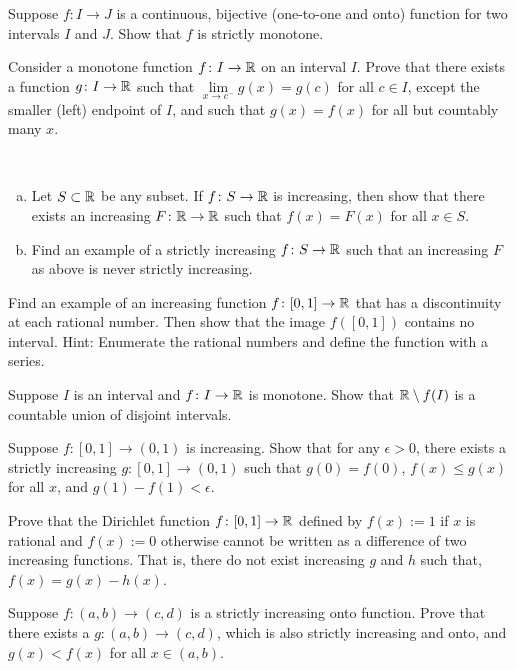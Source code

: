 \begin{exercise}
Suppose $f \colon I \to J$ is a continuous, bijective (one-to-one and onto)
function for two intervals $I$ and $J$.  Show that $f$ is strictly monotone.
\end{exercise}

\begin{exercise}
Consider a monotone function $f \colon I \to {\mathbb{R}}$ on an interval $I$.  Prove that there exists
a function $g \colon I \to {\mathbb{R}}$ such that
$\lim\limits_{x \to c^-} g(x) = g(c)$ for all $c \in I$, except the
smaller (left) endpoint of $I$, and such that
$g(x) = f(x)$ for all but countably many $x$.
\end{exercise}

\begin{exercise}
{\ }
\begin{enumerate}[a)]
\item
Let $S \subset {\mathbb{R}}$ be any subset.  If $f \colon S \to {\mathbb{R}}$ is increasing,
then show that there exists an increasing $F \colon {\mathbb{R}} \to {\mathbb{R}}$
such that $f(x) = F(x)$ for all $x \in S$.
\item
Find an example of a strictly increasing $f \colon S \to {\mathbb{R}}$ such that
an increasing $F$ as above is never strictly increasing.
\end{enumerate}
\end{exercise}

\begin{exercise}[Challenging] \label{exercise:increasingfuncdiscatQ}
Find an example of an increasing function $f \colon [0,1] \to {\mathbb{R}}$
that has a discontinuity at each rational number.  Then show that the image
$f([0,1])$ contains no interval.  Hint: Enumerate
the rational numbers and define
the function with a series.
\end{exercise}

\begin{exercise}
Suppose $I$ is an interval and $f \colon I \to {\mathbb{R}}$ is monotone.
Show that ${\mathbb{R}} \setminus f(I)$ is a countable union of disjoint intervals.
\end{exercise}

\begin{exercise}
Suppose $f \colon [0,1] \to (0,1)$ is increasing.  Show that for any
$\epsilon > 0$, there exists
a strictly increasing $g \colon [0,1] \to (0,1)$ such that
$g(0) = f(0)$, $f(x) \leq g(x)$ for all $x$, and $g(1)-f(1) < \epsilon$.
\end{exercise}

\begin{exercise}
Prove that the Dirichlet function $f \colon [0,1] \to{\mathbb{R}}$ defined by $f(x) :=
1$ if $x$ is rational and $f(x) := 0$ otherwise cannot be written as a
difference of two increasing functions.  That is, there do not exist
increasing $g$ and $h$ such that, $f(x) = g(x) - h(x)$.
\end{exercise}

\begin{exercise}
Suppose $f \colon (a,b) \to (c,d)$ is a strictly increasing
onto function.  Prove that there exists a $g \colon (a,b) \to (c,d)$,
which is also strictly increasing and onto, and $g(x) < f(x)$ for all $x \in
(a,b)$.
\end{exercise}


